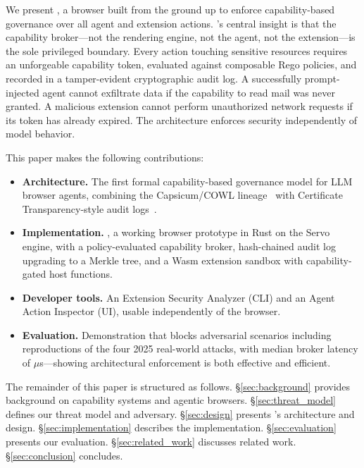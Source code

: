
We present \ferrite{}, a browser built from the ground up to
enforce capability-based governance over all agent and extension
actions.
\ferrite{}'s central insight is that the capability broker---not
the rendering engine, not the agent, not the extension---is the
sole privileged boundary.
Every action touching sensitive resources requires an unforgeable
capability token, evaluated against composable Rego policies,
and recorded in a tamper-evident cryptographic audit log.
A successfully prompt-injected agent cannot exfiltrate data if
the capability to read mail was never granted.
A malicious extension cannot perform unauthorized network requests
if its token has already expired.
The architecture enforces security independently of model behavior.


\noindent This paper makes the following contributions:

\begin{itemize}
  \item \textbf{Architecture.} The first formal capability-based
    governance model for LLM browser agents, combining the
    Capsicum/COWL lineage~\cite{watson2010capsicum,stefan2014cowl}
    with Certificate Transparency-style audit
    logs~\cite{laurie2013rfc6962}.

  \item \textbf{Implementation.} \ferrite{}, a working browser
    prototype in Rust on the Servo engine, with a policy-evaluated
    capability broker, hash-chained audit log upgrading to a Merkle
    tree, and a Wasm extension sandbox with capability-gated host
    functions.

  \item \textbf{Developer tools.} An Extension Security Analyzer
    (CLI) and an Agent Action Inspector (UI), usable independently
    of the browser.

  \item \textbf{Evaluation.} Demonstration that \ferrite{} blocks
     adversarial scenarios including reproductions of the
    four 2025 real-world attacks, with median broker latency of
    $\mu$s---showing architectural enforcement is both
    effective and efficient.
\end{itemize}


The remainder of this paper is structured as follows.
\S\ref{sec:background} provides background on capability systems
and agentic browsers.
\S\ref{sec:threat_model} defines our threat model and adversary.
\S\ref{sec:design} presents \ferrite{}'s architecture and design.
\S\ref{sec:implementation} describes the implementation.
\S\ref{sec:evaluation} presents our evaluation.
\S\ref{sec:related_work} discusses related work.
\S\ref{sec:conclusion} concludes.
